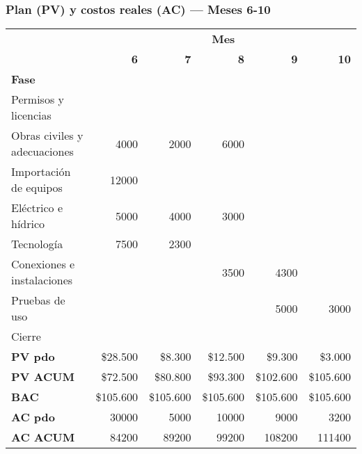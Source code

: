 \subsubsection*{Plan (PV) y costos reales (AC) — Meses 6-10}
\begin{table}[H]\centering\small
\begin{tabular}{lrrrrr}
\toprule
 & \multicolumn{5}{c}{\textbf{Mes}} \\
\cmidrule(lr){2-6}
 & \textbf{6} & \textbf{7} & \textbf{8} & \textbf{9} & \textbf{10} \\
\midrule
\textbf{Fase} & & & & & \\
Permisos y licencias        &      &      &      &      &      \\
Obras civiles y adecuaciones& 4000 & 2000 & 6000 &      &      \\
Importación de equipos      & 12000&      &      &      &      \\
Eléctrico e hídrico         & 5000 & 4000 & 3000 &      &      \\
Tecnología                  & 7500 & 2300 &      &      &      \\
Conexiones e instalaciones  &      &      & 3500 & 4300 &      \\
Pruebas de uso              &      &      &      & 5000 & 3000 \\
Cierre                      &      &      &      &      &      \\
\midrule
\textbf{PV pdo}  & \$28{.}500 & \$8{.}300 & \$12{.}500 & \$9{.}300 & \$3{.}000 \\
\textbf{PV ACUM} & \$72{.}500 & \$80{.}800 & \$93{.}300 & \$102{.}600 & \$105{.}600 \\
\textbf{BAC}     & \$105{.}600 & \$105{.}600 & \$105{.}600 & \$105{.}600 & \$105{.}600 \\
\midrule
\textbf{AC pdo}  & 30000 & 5000 & 10000 & 9000 & 3200 \\
\textbf{AC ACUM} & 84200 & 89200 & 99200 & 108200 & 111400 \\
\bottomrule
\end{tabular}
\end{table}

